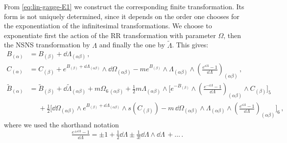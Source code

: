 \documentclass[debug]{phd}
\begin{document}
				From \eqref{eq:lin-gauge-E1} we construct the corresponding finite transformation.
				Its form is not uniquely determined, since it depends on the order one chooses for the exponentiation of the infinitesimal transformations. 
				We choose to exponentiate first the action of the RR transformation with parameter $\Omega$, then the NSNS transformation by $ \Lambda$ and finally the one by $\tilde \Lambda$. 
				This gives:
						\begin{equation}\label{eq:finite-gauge-E1}
							\begin{split}
								B_{(\alpha)} &= B_{(\beta)} + \dd \Lambda_{(\alpha\beta)} \, ,\\
								C_{(\alpha)} &= C_{(\beta)} + e^{B_{(\beta)} + \dd \Lambda_{(\alpha\beta)}} \wedge \dd \Omega_{(\alpha\beta)} - m e^{B_{(\beta)} } \wedge\Lambda_{(\alpha\beta)} \wedge \left( \tfrac{e^{\dd \Lambda}-1}{\dd \Lambda} \right)_{(\alpha\beta)} \, , \\
								\tilde{B}_{(\alpha)} &= \tilde{B}_{(\beta)} + \dd \tilde \Lambda_{(\alpha\beta)} + m \Omega_{6 \ (\alpha\beta)} + \tfrac{1}{2} m \Lambda_{(\alpha\beta)} \wedge \Big[ e^{-B_{(\beta)} } \wedge \left(\tfrac{ e^{-\dd \Lambda}-1}{\dd \Lambda} \right)_{(\alpha\beta)} \wedge C_{(\beta)} \Big]_5 \\
												&\phantom{=} + \tfrac{1}{2} \Big[ \dd \Omega_{(\alpha\beta)} \wedge e^{B_{(\beta)} + \dd \Lambda_{(\alpha\beta)}} \wedge s( C_{(\beta)} ) - m\, \dd \Omega_{(\alpha\beta)} \wedge \Lambda_{(\alpha\beta)} \wedge \left( \tfrac{e^{\dd \Lambda}-1}{\dd \Lambda} \right)_{(\alpha\beta)} \Big]_6 \,,
							\end{split}
						\end{equation}
				where we used the shorthand notation
						\begin{equation}
							\tfrac{e^{\pm\dd \Lambda} - 1}{\dd \Lambda} = \pm 1 + \tfrac{1}{2} \dd \Lambda \pm \tfrac{1}{3!} \dd \Lambda \wedge \dd \Lambda\, + \dots \, .
						\end{equation}
				
\end{document}
